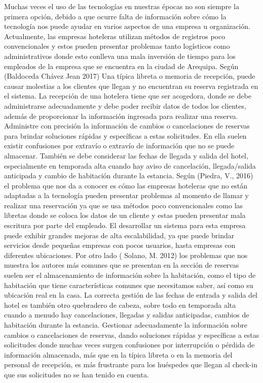 \documentclass[12pt,a4paper,oneside]{article}
\begin{document}
Muchas veces el uso de las tecnologías en nuestras épocas no son siempre la primera opción, debido a que ocurre falta de información sobre cómo la tecnología nos puede ayudar en varios aspectos de una empresa u organización. Actualmente, las empresas hoteleras utilizan métodos de registros poco convencionales y estos pueden presentar problemas tanto logísticos como administrativos donde esto conlleva una mala inversión de tiempo para los empleados de la empresa que se encuentra en la ciudad de Arequipa.   
Según (Baldoceda Chávez Jean 2017) Una típica libreta o memoria de recepción, puede causar molestias a los clientes que llegan y no encuentran su reserva registrada en el sistema. La recepción de una hotelera tiene que ser acogedora, donde se debe administrarse adecuadamente y debe poder recibir datos de todos los clientes, además de proporcionar la información ingresada para realizar una reserva. Administre con precisión la información de cambios o cancelaciones de reservas para brindar soluciones rápidas y específicas a estas solicitudes. En ella suelen existir confusiones por extravío o extravío de información que no se puede almacenar. También se debe considerar las fechas de llegada y salida del hotel, especialmente en temporada alta cuando hay aviso de cancelación, llegada/salida anticipada y cambio de habitación durante la estancia. Según (Piedra, V., 2016) el problema que nos da a conocer es cómo las empresas hoteleras que no están adaptadas a la tecnología pueden presentar problemas al momento de llamar y realizar una reservación ya que se usa métodos poco convencionales como las libretas donde se coloca los datos de un cliente y estas pueden presentar mala escritura por parte del empleado. El desarrollar un sistema para esta empresa puede exhibir grandes mejoras de alta escalabilidad, ya que puede brindar servicios desde pequeñas empresas con pocos usuarios, hasta empresas con diferentes ubicaciones.  
Por otro lado (	Solano, M. 2012) los problemas que nos muestra los autores más comunes que se presentan en la sección de reservas suelen ser el almacenamiento de información sobre la habitación, como el tipo de habitación que tiene características comunes que necesitamos saber, así como su ubicación real en la casa. La correcta gestión de las fechas de entrada y salida del hotel es también otro quebradero de cabeza, sobre todo en temporada alta cuando a menudo hay cancelaciones, llegadas y salidas anticipadas, cambios de habitación durante la estancia. Gestionar adecuadamente la información sobre cambios o cancelaciones de reservas, dando soluciones rápidas y específicas a estas solicitudes donde muchas veces surgen confusiones por interrupción o pérdida de información almacenada, más que en la típica libreta o en la memoria del personal de recepción, es más frustrante para los huéspedes que llegan al check-in que sus solicitudes no se han tenido en cuenta.
\end{document}
